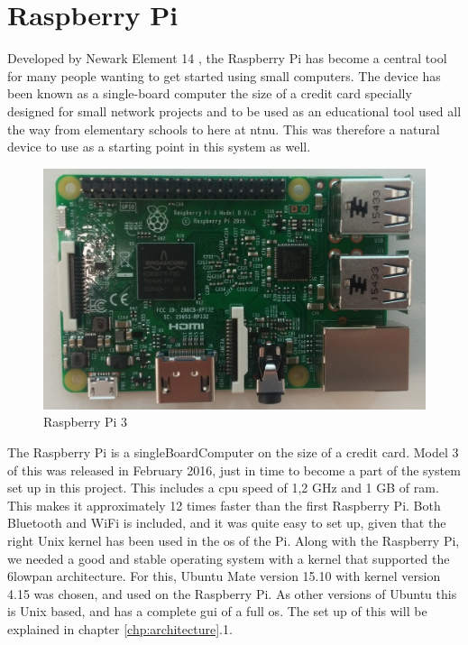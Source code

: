 
\section{Raspberry Pi}

Developed by Newark Element 14 \cite{newark}, the Raspberry Pi has become a central tool for many people wanting to get started using small computers. The device has been known as a single-board computer the size of a credit card specially designed for small network projects and to be used as an educational tool used all the way from elementary schools to here at \gls{ntnu}. This was therefore a natural device to use as a starting point in this system as well. 

\begin{figure}[ht]
    \centering
    \includegraphics[scale=0.35]{pi3.png}    
    \caption{Raspberry Pi 3}
    \label{fig:piPicture}
\end{figure}

The Raspberry Pi is a \gls{singleBoardComputer} on the size of a credit card. Model 3 of this was released in February 2016, just in time to become a part of the system set up in this project. This includes a \gls{cpu} speed of 1,2 GHz and 1 GB of \gls{ram}. This makes it approximately 12 times faster than the first Raspberry Pi. Both Bluetooth and WiFi is included, and it was quite easy to set up, given that the right Unix kernel has been used in the \gls{os} of the Pi. Along with the Raspberry Pi, we needed a good and stable operating system with a kernel that supported the \gls{6lowpan} architecture. For this, Ubuntu Mate version 15.10 with kernel version 4.15 was chosen, and used on the Raspberry Pi. As other versions of Ubuntu this is Unix based, and has a complete \gls{gui} of a full \gls{os}. The set up of this will be explained in chapter \ref{chp:architecture}.1. 

